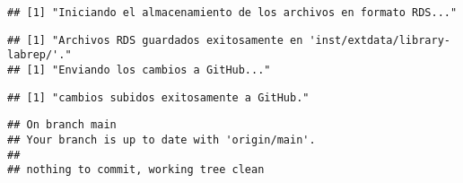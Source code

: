 \documentclass[
]{article}
\begin{document}
\begin{verbatim}
## [1] "Iniciando el almacenamiento de los archivos en formato RDS..."
\end{verbatim}

\begin{verbatim}
## [1] "Archivos RDS guardados exitosamente en 'inst/extdata/library-labrep/'."
## [1] "Enviando los cambios a GitHub..."
\end{verbatim}

\begin{verbatim}
## [1] "cambios subidos exitosamente a GitHub."
\end{verbatim}

\begin{verbatim}
## On branch main
## Your branch is up to date with 'origin/main'.
## 
## nothing to commit, working tree clean
\end{verbatim}


\end{document}
